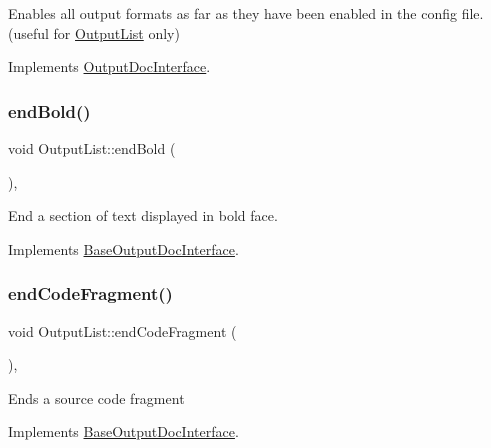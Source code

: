 Enables all output formats as far as they have been enabled in the config file. (useful for \mbox{\hyperlink{class_output_list}{Output\+List}} only) 

Implements \mbox{\hyperlink{class_output_doc_interface_a418b5b7b81a6d37eff05a7cfe8143573}{Output\+Doc\+Interface}}.

\mbox{\label{class_output_list_aa3f855a4e60d2a7c6769b66d43c69b23}} 
\subsubsection{\texorpdfstring{endBold()}{endBold()}}
{\footnotesize\ttfamily void Output\+List\+::end\+Bold (\begin{DoxyParamCaption}{ }\end{DoxyParamCaption})\hspace{0.3cm}{\ttfamily [inline]}, {\ttfamily [virtual]}}

End a section of text displayed in bold face. 

Implements \mbox{\hyperlink{class_base_output_doc_interface_a2a17911ba778f8efac83999fb5d190d9}{Base\+Output\+Doc\+Interface}}.

\mbox{\label{class_output_list_a9fccddf083f487654f6e6ce261fafff8}} 
\subsubsection{\texorpdfstring{endCodeFragment()}{endCodeFragment()}}
{\footnotesize\ttfamily void Output\+List\+::end\+Code\+Fragment (\begin{DoxyParamCaption}{ }\end{DoxyParamCaption})\hspace{0.3cm}{\ttfamily [inline]}, {\ttfamily [virtual]}}

Ends a source code fragment 

Implements \mbox{\hyperlink{class_base_output_doc_interface_a08f032482a8f23ac1aab66552db43a81}{Base\+Output\+Doc\+Interface}}.

\mbox{\label{class_output_list_a0e08c34eb6d9058342d0bd7fdc2a453d}} 
